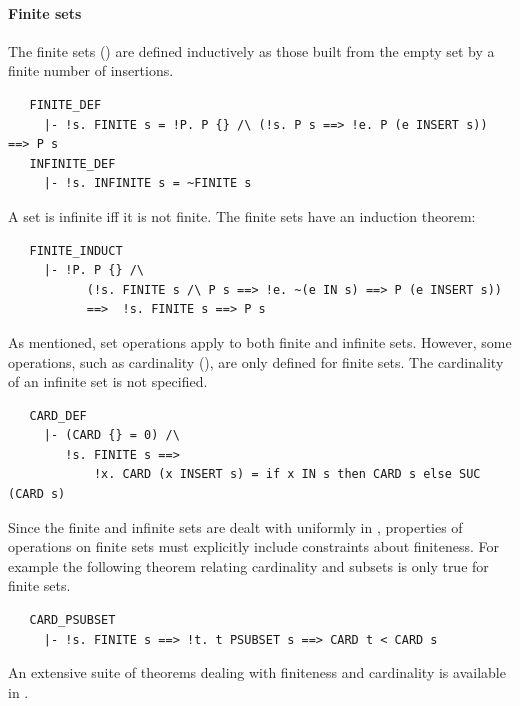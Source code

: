 \paragraph{Finite sets}
The finite sets () are defined inductively as those
built from the empty set by a finite number of insertions.
%
\begin{hol}
\begin{verbatim}
   FINITE_DEF
     |- !s. FINITE s = !P. P {} /\ (!s. P s ==> !e. P (e INSERT s)) ==> P s
   INFINITE_DEF
     |- !s. INFINITE s = ~FINITE s
\end{verbatim}
\end{hol}
%
\noindent
A set is infinite iff it is not finite. The finite sets have an
induction theorem:
%
%
\begin{hol}
\begin{verbatim}
   FINITE_INDUCT
     |- !P. P {} /\
           (!s. FINITE s /\ P s ==> !e. ~(e IN s) ==> P (e INSERT s))
           ==>  !s. FINITE s ==> P s
\end{verbatim}
\end{hol}
%
As mentioned, set operations apply to both finite and infinite
sets. However, some operations, such as cardinality
(), are only defined for finite sets.  The
cardinality of an infinite set is not specified.
%
\begin{hol}
\begin{verbatim}
   CARD_DEF
     |- (CARD {} = 0) /\
        !s. FINITE s ==>
            !x. CARD (x INSERT s) = if x IN s then CARD s else SUC (CARD s)
\end{verbatim}
\end{hol}
%
Since the finite and infinite sets are dealt with uniformly in
, properties of operations on finite sets must
explicitly include constraints about finiteness. For example the
following theorem relating cardinality and subsets is only true for
finite sets.
%
\begin{hol}
\begin{verbatim}
   CARD_PSUBSET
     |- !s. FINITE s ==> !t. t PSUBSET s ==> CARD t < CARD s
\end{verbatim}
\end{hol}
%
An extensive suite of theorems dealing with finiteness and cardinality
is available in .

